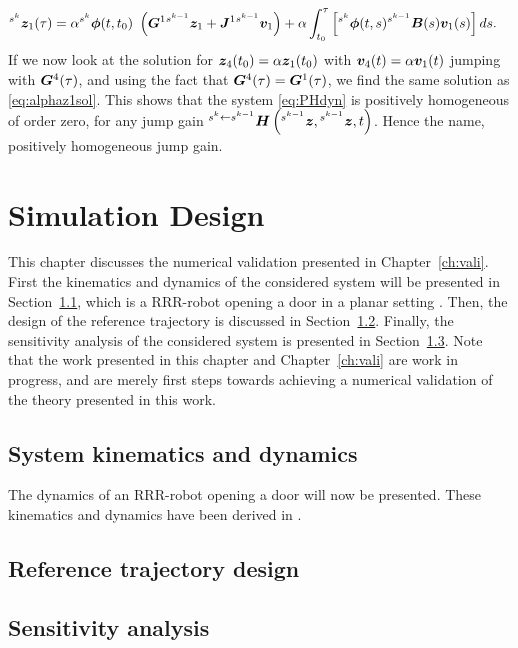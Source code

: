 \documentclass[../DC2017114Bouma.tex]{subfiles}
\begin{document}
\begin{align}
\ls^{s^{k}}\zb_1(\tau) &= \alpha \ls^{s^{k}}\phib(t,t_0)\ \left(\Gb^1 \ls^{s^{k-1}}\zb_1 + \Jb^1\ls^{s^{k-1}}\vb_1\right) + \alpha\int_{t_0}^\tau \left[\ls^{s^{k}}\phib(t,s)\ls^{s^{k-1}}\Bb(s)\vb_1(s)\right]ds.\label{eq:alphaz1sol}
\end{align}
If we now look at the solution for ${\boldsymbol{z}}_4(t_0) = \alpha{\boldsymbol{z}}_1(t_0)$ with ${\boldsymbol{v}}_4(t) = \alpha{\boldsymbol{v}}_1(t)$ jumping with ${\boldsymbol{G}}^4(\tau)$, and using the fact that ${\boldsymbol{G}}^4(\tau) = {\boldsymbol{G}}^1(\tau)$, we find the same solution as \eqref{eq:alphaz1sol}. This shows that the system \eqref{eq:PHdyn} is positively homogeneous of order zero, for any jump gain $^{s^{k}\leftarrow s^{k-1}}{\boldsymbol{H}}\left(\hspace{0cm}^{s^{k-1}}{\boldsymbol{z}},\hspace{0cm}^{s^{k-1}}{\boldsymbol{z}},t\right)$. Hence the name, positively homogeneous jump gain. 


\pagestyle{fancyreport}
\cleartooddpage
\pagestyle{fancyreport}
\chapter{Simulation Design}\label{app:sim}
This chapter discusses the numerical validation presented in Chapter~\ref{ch:vali}. First the kinematics and dynamics of the considered system will be presented in Section~\ref{app:kindyn}, which is a RRR-robot opening a door in a planar setting \cite{Rijnen2018b}. Then, the design of the reference trajectory is discussed in Section~\ref{app:trajdesign}. Finally, the sensitivity analysis of the considered system is presented in Section~\ref{app:sens}. Note that the work presented in this chapter and Chapter~\ref{ch:vali} are work in progress, and are merely first steps towards achieving a numerical validation of the theory presented in this work.

\section{System kinematics and dynamics}\label{app:kindyn}
The dynamics of an RRR-robot opening a door will now be presented. These kinematics and dynamics have been derived in \cite{Rijnen2018b}.
\section{Reference trajectory design}\label{app:trajdesign}

\section{Sensitivity analysis}\label{app:sens}
\end{document}
